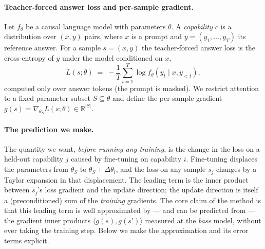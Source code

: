 \documentclass{article} %
\begin{document}
\paragraph{Teacher-forced answer loss and per-sample gradient.}
Let $f_\theta$ be a causal language model with parameters $\theta$. A \emph{capability} $c$ is a
distribution over $(x,y)$ pairs, where $x$ is a prompt and $y=(y_1,\dots,y_T)$ its reference
answer. For a sample $s=(x,y)$ the teacher-forced answer loss is the cross-entropy of $y$ under
the model conditioned on $x$,
\begin{equation}
  L(s;\theta) \;=\; -\frac{1}{T}\sum_{t=1}^{T} \log f_\theta\!\left(y_t \mid x, y_{<t}\right),
\end{equation}
computed only over answer tokens (the prompt is masked). We restrict attention to a fixed
parameter subset $S\subseteq\theta$ and define the per-sample gradient
$g(s) = \nabla_{\theta_S} L(s;\theta) \in \mathbb{R}^{|S|}$.

\paragraph{The prediction we make.}
The quantity we want, \emph{before running any training}, is the change in the loss on a
held-out capability $j$ caused by fine-tuning on capability $i$. Fine-tuning displaces the
parameters from $\theta_S$ to $\theta_S+\Delta\theta_i$, and the loss on any sample $s_j$ changes
by a Taylor expansion in that displacement. The leading term is the inner product between $s_j$'s
loss gradient and the update direction; the update direction is itself a (preconditioned) sum of
the \emph{training} gradients. The core claim of the method is that this leading term is well
approximated by --- and can be predicted from --- the gradient inner products
$\langle g(s), g(s')\rangle$ measured at the \emph{base} model, without ever taking the training
step. Below we make the approximation and its error terms explicit.
\end{document}
